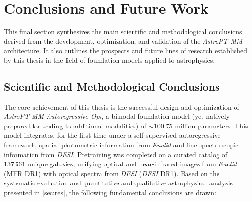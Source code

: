 
\section{Conclusions and Future Work} \label{sec:concl}

This final section synthesizes the main scientific and methodological conclusions derived from the development, optimization, and validation of the \textit{AstroPT MM} architecture. It also outlines the prospects and future lines of research established by this thesis in the field of foundation models applied to astrophysics.

\subsection{Scientific and Methodological Conclusions} \label{sec:concl:sci}

The core achievement of this thesis is the successful design and optimization of \textit{AstroPT MM Autoregressive Opt}, a bimodal foundation model (yet natively prepared for scaling to additional modalities) of $\sim 100.75$ million parameters. This model integrates, for the first time under a self-supervised autoregressive framework, spatial photometric information from \textit{Euclid} and fine spectroscopic information from \textit{\gls{DESI}}. Pretraining was completed on a curated catalog of $137\,661$ unique galaxies, unifying optical and near-infrared images from \textit{Euclid} (MER DR1) with optical spectra from \textit{\gls{DESI}} (\textit{\gls{DESI}} DR1). Based on the systematic evaluation and quantitative and qualitative astrophysical analysis presented in \cref{sec:res}, the following fundamental conclusions are drawn:

